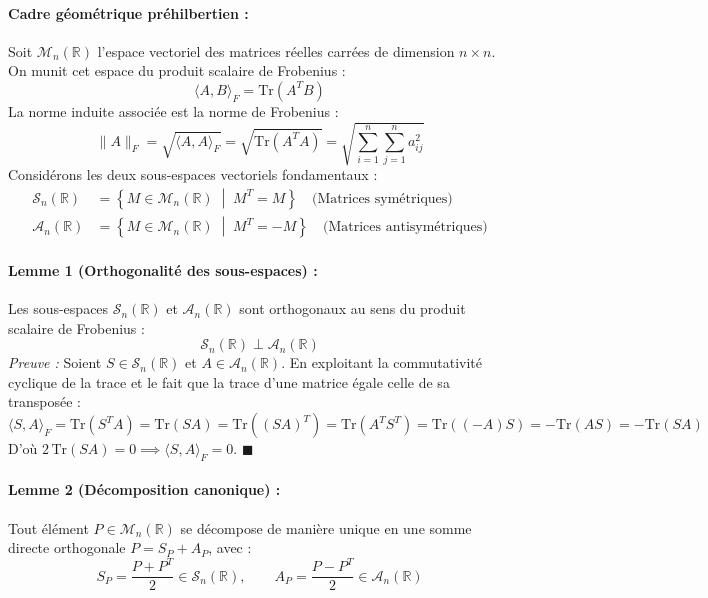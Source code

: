 \documentclass[../Formulations_Kalman.tex]{subfiles}
\begin{document}
\paragraph{Cadre géométrique préhilbertien :}
Soit $\mathcal{M}_n(\mathbb{R})$ l'espace vectoriel des matrices réelles carrées de dimension $n \times n$. On munit cet espace du produit scalaire de Frobenius :
\begin{equation}
\langle A, B \rangle_F = \text{Tr}\left(A^T B\right)
\end{equation}
La norme induite associée est la norme de Frobenius :
\begin{equation}
\|A\|_F = \sqrt{\langle A, A \rangle_F} = \sqrt{\text{Tr}\left(A^T A\right)} = \sqrt{\sum_{i=1}^n \sum_{j=1}^n a_{ij}^2}
\end{equation}
Considérons les deux sous-espaces vectoriels fondamentaux :
\begin{align}
\mathcal{S}_n(\mathbb{R}) &= \left\{ M \in \mathcal{M}_n(\mathbb{R}) \;\middle|\; M^T = M \right\} \quad \text{(Matrices symétriques)} \\
\mathcal{A}_n(\mathbb{R}) &= \left\{ M \in \mathcal{M}_n(\mathbb{R}) \;\middle|\; M^T = -M \right\} \quad \text{(Matrices antisymétriques)}
\end{align}

\paragraph{Lemme 1 (Orthogonalité des sous-espaces) :}
Les sous-espaces $\mathcal{S}_n(\mathbb{R})$ et $\mathcal{A}_n(\mathbb{R})$ sont orthogonaux au sens du produit scalaire de Frobenius :
\begin{equation}
\mathcal{S}_n(\mathbb{R}) \perp \mathcal{A}_n(\mathbb{R})
\end{equation}
\textit{Preuve :} Soient $S \in \mathcal{S}_n(\mathbb{R})$ et $A \in \mathcal{A}_n(\mathbb{R})$. En exploitant la commutativité cyclique de la trace et le fait que la trace d'une matrice égale celle de sa transposée :
\begin{equation}
\langle S, A \rangle_F = \text{Tr}(S^T A) = \text{Tr}(S A) = \text{Tr}\left((S A)^T\right) = \text{Tr}(A^T S^T) = \text{Tr}((-A) S) = -\text{Tr}(A S) = -\text{Tr}(S A)
\end{equation}
D'où $2\,\text{Tr}(S A) = 0 \implies \langle S, A \rangle_F = 0$. $\blacksquare$

\paragraph{Lemme 2 (Décomposition canonique) :}
Tout élément $P \in \mathcal{M}_n(\mathbb{R})$ se décompose de manière unique en une somme directe orthogonale $P = S_P + A_P$, avec :
\begin{equation}
S_P = \frac{P + P^T}{2} \in \mathcal{S}_n(\mathbb{R}), \qquad A_P = \frac{P - P^T}{2} \in \mathcal{A}_n(\mathbb{R})
\end{equation}
\end{document}
